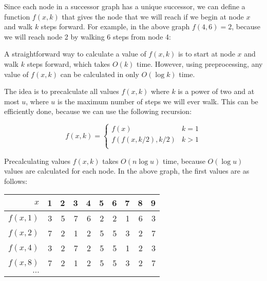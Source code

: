 Since each node in a successor graph has a
unique successor, we can define a function $f(x,k)$
that gives the node that we will reach if
we begin at node $x$ and walk $k$ steps forward.
For example, in the above graph $f(4,6)=2$,
because we will reach node 2 by walking 6 steps from node 4:

\begin{center}
\end{center}

A straightforward way to calculate a value of $f(x,k)$
is to start at node $x$ and walk $k$ steps forward, which takes $O(k)$ time.
However, using preprocessing, any value of $f(x,k)$
can be calculated in only $O(\log k)$ time.

The idea is to precalculate all values $f(x,k)$ where
$k$ is a power of two and at most $u$, where $u$ is
the maximum number of steps we will ever walk.
This can be efficiently done, because
we can use the following recursion:

\begin{equation*}
    f(x,k) = \begin{cases}
               f(x)              & k = 1\\
               f(f(x,k/2),k/2)   & k > 1\\
           \end{cases}
\end{equation*}

Precalculating values $f(x,k)$ takes $O(n \log u)$ time,
because $O(\log u)$ values are calculated for each node.
In the above graph, the first values are as follows:

\begin{center}
\begin{tabular}{r|rrrrrrrrr}
$x$ & 1 & 2 & 3 & 4 & 5 & 6 & 7 & 8 & 9 \\
\hline
$f(x,1)$ & 3 & 5 & 7 & 6 & 2 & 2 & 1 & 6 & 3 \\
$f(x,2)$ & 7 & 2 & 1 & 2 & 5 & 5 & 3 & 2 & 7 \\
$f(x,4)$ & 3 & 2 & 7 & 2 & 5 & 5 & 1 & 2 & 3 \\
$f(x,8)$ & 7 & 2 & 1 & 2 & 5 & 5 & 3 & 2 & 7 \\
$\cdots$ \\
\end{tabular}
\end{center}

